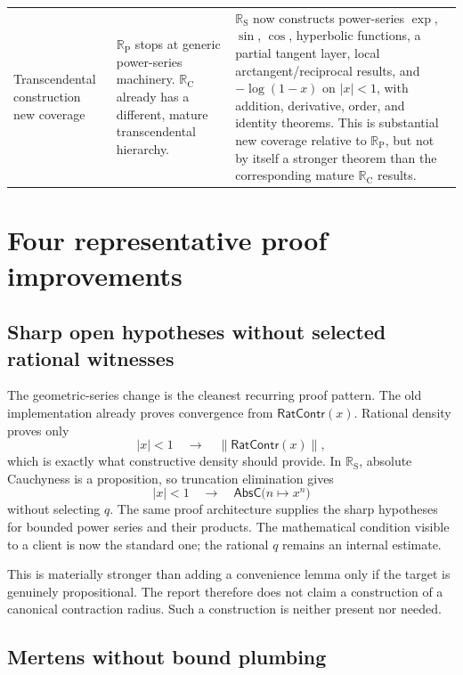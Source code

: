 \documentclass[11pt,a4paper]{article}
\newcommand{\RC}{\mathbb{R}_{\mathrm C}}
\newcommand{\RP}{\mathbb{R}_{\mathrm P}}
\newcommand{\RS}{\mathbb{R}_{\mathrm S}}
\newcommand{\brck}[1]{\left\lVert #1\right\rVert}
\newcommand{\AbsC}{\mathsf{AbsC}}
\newcommand{\RatContr}{\mathsf{RatContr}}
\newcommand{\newcov}{\textcolor{green!40!black}{\textsf{new coverage}}}
\begin{document}
\begin{longtable}{>{\raggedright\arraybackslash}p{}
                  >{\raggedright\arraybackslash}p{}
                  >{\raggedright\arraybackslash}p{}}
Transcendental construction
\newline\newcov
& $\RP$ stops at generic power-series machinery.  $\RC$ already has a different, mature
transcendental hierarchy.
& $\RS$ now constructs power-series $\exp$, $\sin$, $\cos$, hyperbolic functions, a partial
tangent layer, local arctangent/reciprocal results, and $-\log(1-x)$ on $|x|<1$, with addition,
derivative, order, and identity theorems.  This is substantial new coverage relative to
$\RP$, but not by itself a stronger theorem than the corresponding mature $\RC$ results.\\
\end{longtable}

\section{Four representative proof improvements}

\subsection{Sharp open hypotheses without selected rational witnesses}

The geometric-series change is the cleanest recurring proof pattern.  The old implementation
already proves convergence from $\RatContr(x)$.  Rational density proves only
\[
  |x|<1\quad\longrightarrow\quad\brck{\RatContr(x)},
\]
which is exactly what constructive density should provide.  In $\RS$, absolute Cauchyness is
a proposition, so truncation elimination gives
\[
  |x|<1\quad\longrightarrow\quad
  \AbsC\bigl(n\mapsto x^n\bigr)
\]
without selecting $q$.  The same proof architecture supplies the sharp hypotheses for bounded
power series and their products.  The mathematical condition visible to a client is now the
standard one; the rational $q$ remains an internal estimate.

This is materially stronger than adding a convenience lemma only if the target is genuinely
propositional.  The report therefore does not claim a construction of a canonical contraction
radius.  Such a construction is neither present nor needed.

\subsection{Mertens without bound plumbing}
\end{document}
